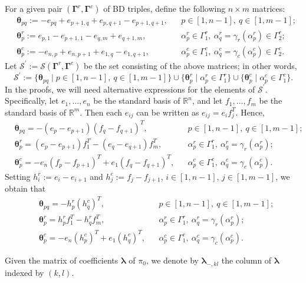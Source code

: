 \documentclass[11pt]{article}
\newcommand{\blambda}{\boldsymbol{\lambda}}
\newcommand{\btheta}{{\boldsymbol{\theta}}}
\newcommand{\bg}{\mathbf{\Gamma}}
\theoremstyle{definition}\newtheorem{definition}[theorem]{Definition}
\theoremstyle{definition}\newtheorem{remark}[theorem]{Remark}
\theoremstyle{remark}
\numberwithin{equation}{section}
\begin{document}
For a given pair $(\bg^r,\bg^c)$ of BD triples, define the following $n \times m$ matrices:
\begin{align*}
    & \btheta_{pq} := -e_{pq} + e_{p+1,q} + e_{p,q+1} - e_{p+1,q+1}, & &p\in [1,n-1], \ q \in [1,m-1];\\
    & \btheta_{p}^r:= e_{p,1} - e_{p+1,1} - e_{q,m} + e_{q+1,m}, & & \alpha_p^r \in \Gamma_1^r, \ \alpha_q^r=\gamma_r(\alpha_p^r) \in \Gamma_2^r;\\
    & \btheta_{p}^c:= -e_{n,p} + e_{n,p+1} + e_{1,q} - e_{1,q+1},& &\alpha_p^c \in \Gamma_1^c, \ \alpha_q^c=\gamma_c(\alpha_p^c) \in \Gamma_2^c.
\end{align*}
Let $\mathcal{S}^\prime:= \mathcal{S}(\bg^r,\bg^c)$ be the set consisting of the above matrices; in other words,
\begin{equation*}
    \mathcal{S}^\prime:= \{\btheta_{pq} \mid p\in [1,n-1], \ q \in [1,m-1]\} \cup \{\btheta_{p}^r \mid \alpha_p^r \in \Gamma_1^r\} \cup \{\btheta_{p}^c \mid \alpha_p^c \in \Gamma_1^c\}.
\end{equation*}
In the proofs, we will need alternative expressions for the elements of $\mathcal{S}^\prime$. Specifically, let $e_1,\ldots,e_n$ be the standard basis of $\mathbb{R}^n$, and let $f_1,\ldots,f_m$ be the standard basis of $\mathbb{R}^m$. Then each  $e_{ij}$ can be written as $e_{ij} = e_i f_j^T$. Hence, 
\begin{align*}
    &\btheta_{pq} = -(e_p-e_{p+1})(f_q-f_{q+1})^T, & & p \in [1,n-1], \ q \in [1,m-1];\\
    &\btheta_p^r = (e_p-e_{p+1})f_1^T - (e_q-e_{q+1})f_m^T, & & \alpha_p^r \in \Gamma_1^r, \ \alpha_q^r = \gamma_r(\alpha_p^r);\\
    &\btheta_p^c = -e_n(f_p-f_{p+1})^T + e_1(f_q-f_{q+1})^T, & & \alpha_p^c \in \Gamma_1^c, \ \alpha_q^c = \gamma_c(\alpha_p^c).
\end{align*}
Setting $h_i^r := e_i - e_{i+1}$ and $h_j^c := f_j - f_{j+1}$, $i \in [1,n-1]$, $j \in [1,m-1]$, we obtain that
\begin{align*}
    &\btheta_{pq} = -h_p^r(h_q^c)^T, & & p \in [1,n-1], \ q \in [1,m-1];\\
    &\btheta_p^r = h_p^rf_1^T - h_q^rf_m^T, & & \alpha_p^r \in \Gamma_1^r, \ \alpha_q^r = \gamma_r(\alpha_p^r);\\
    &\btheta_p^c = -e_n(h_p^c)^T + e_1(h_q^c)^T, & & \alpha_p^c \in \Gamma_1^c, \ \alpha_q^c = \gamma_c(\alpha_p^c).
\end{align*}

Given the matrix of coefficients $\blambda$ of $\pi_0$, we denote by $\blambda_{-,kl}$ the column of $\blambda$ indexed by $(k,l)$.
 
\end{document}

